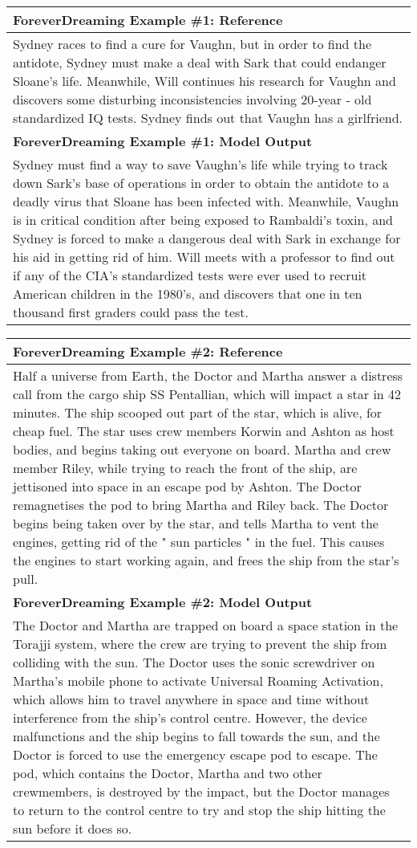 \begin{table}[!htbp]
    \centering
    \tiny
    \begin{tabular}{p{\linewidth}} 
    \toprule
    \textbf{ForeverDreaming Example \#1: Reference} \\
    \midrule
    Sydney races to find a cure for Vaughn, but in order to find the antidote, Sydney must make a deal with Sark that could endanger Sloane's life. Meanwhile, Will continues his research for Vaughn and discovers some disturbing inconsistencies involving 20-year - old standardized IQ tests. Sydney finds out that Vaughn has a girlfriend.
    \\
    \midrule
    \textbf{ForeverDreaming Example \#1: Model Output} \\
    \midrule
    Sydney must find a way to save Vaughn's life while trying to track down Sark's base of operations in order to obtain the antidote to a deadly virus that Sloane has been infected with. Meanwhile, Vaughn is in critical condition after being exposed to Rambaldi's toxin, and Sydney is forced to make a dangerous deal with Sark in exchange for his aid in getting rid of him. Will meets with a professor to find out if any of the CIA's standardized tests were ever used to recruit American children in the 1980's, and discovers that one in ten thousand first graders could pass the test.
    \\
    \end{tabular}
    \begin{tabular}{p{\linewidth}} 
    \midrule
    \textbf{ForeverDreaming Example \#2: Reference} \\
    \midrule
    Half a universe from Earth, the Doctor and Martha answer a distress call from the cargo ship SS Pentallian, which will impact a star in 42 minutes. The ship scooped out part of the star, which is alive, for cheap fuel. The star uses crew members Korwin and Ashton as host bodies, and begins taking out everyone on board. Martha and crew member Riley, while trying to reach the front of the ship, are jettisoned into space in an escape pod by Ashton. The Doctor remagnetises the pod to bring Martha and Riley back. The Doctor begins being taken over by the star, and tells Martha to vent the engines, getting rid of the " sun particles " in the fuel. This causes the engines to start working again, and frees the ship from the star's pull.
    \\
    \midrule
    \textbf{ForeverDreaming Example \#2: Model Output} \\
    \midrule
    The Doctor and Martha are trapped on board a space station in the Torajji system, where the crew are trying to prevent the ship from colliding with the sun. The Doctor uses the sonic screwdriver on Martha's mobile phone to activate Universal Roaming Activation, which allows him to travel anywhere in space and time without interference from the ship's control centre. However, the device malfunctions and the ship begins to fall towards the sun, and the Doctor is forced to use the emergency escape pod to escape. The pod, which contains the Doctor, Martha and two other crewmembers, is destroyed by the impact, but the Doctor manages to return to the control centre to try and stop the ship hitting the sun before it does so.

\end{tabular}
\end{table}
